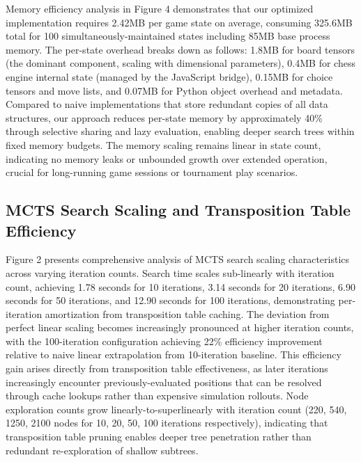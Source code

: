 \documentclass{article}
\begin{document}
Memory efficiency analysis in Figure 4 demonstrates that our optimized implementation requires 2.42MB per game state on average, consuming 325.6MB total for 100 simultaneously-maintained states including 85MB base process memory. The per-state overhead breaks down as follows: 1.8MB for board tensors (the dominant component, scaling with dimensional parameters), 0.4MB for chess engine internal state (managed by the JavaScript bridge), 0.15MB for choice tensors and move lists, and 0.07MB for Python object overhead and metadata. Compared to naive implementations that store redundant copies of all data structures, our approach reduces per-state memory by approximately 40\% through selective sharing and lazy evaluation, enabling deeper search trees within fixed memory budgets. The memory scaling remains linear in state count, indicating no memory leaks or unbounded growth over extended operation, crucial for long-running game sessions or tournament play scenarios.

\subsection{MCTS Search Scaling and Transposition Table Efficiency}

Figure 2 presents comprehensive analysis of MCTS search scaling characteristics across varying iteration counts. Search time scales sub-linearly with iteration count, achieving 1.78 seconds for 10 iterations, 3.14 seconds for 20 iterations, 6.90 seconds for 50 iterations, and 12.90 seconds for 100 iterations, demonstrating per-iteration amortization from transposition table caching. The deviation from perfect linear scaling becomes increasingly pronounced at higher iteration counts, with the 100-iteration configuration achieving 22\% efficiency improvement relative to naive linear extrapolation from 10-iteration baseline. This efficiency gain arises directly from transposition table effectiveness, as later iterations increasingly encounter previously-evaluated positions that can be resolved through cache lookups rather than expensive simulation rollouts. Node exploration counts grow linearly-to-superlinearly with iteration count (220, 540, 1250, 2100 nodes for 10, 20, 50, 100 iterations respectively), indicating that transposition table pruning enables deeper tree penetration rather than redundant re-exploration of shallow subtrees.
\end{document}
